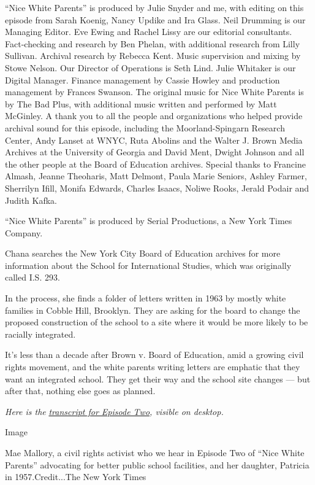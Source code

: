 ``Nice White Parents'' is produced by Julie Snyder and me, with editing
on this episode from Sarah Koenig, Nancy Updike and Ira Glass. Neil
Drumming is our Managing Editor. Eve Ewing and Rachel Lissy are our
editorial consultants. Fact-checking and research by Ben Phelan, with
additional research from Lilly Sullivan. Archival research by Rebecca
Kent. Music supervision and mixing by Stowe Nelson. Our Director of
Operations is Seth Lind. Julie Whitaker is our Digital Manager. Finance
management by Cassie Howley and production management by Frances
Swanson. The original music for Nice White Parents is by The Bad Plus,
with additional music written and performed by Matt McGinley. A thank
you to all the people and organizations who helped provide archival
sound for this episode, including the Moorland-Spingarn Research Center,
Andy Lanset at WNYC, Ruta Abolins and the Walter J. Brown Media Archives
at the University of Georgia and David Ment, Dwight Johnson and all the
other people at the Board of Education archives. Special thanks to
Francine Almash, Jeanne Theoharis, Matt Delmont, Paula Marie Seniors,
Ashley Farmer, Sherrilyn Ifill, Monifa Edwards, Charles Isaacs, Noliwe
Rooks, Jerald Podair and Judith Kafka.

``Nice White Parents'' is produced by Serial Productions, a New York
Times Company.

Chana searches the New York City Board of Education archives for more
information about the School for International Studies, which was
originally called I.S. 293.

In the process, she finds a folder of letters written in 1963 by mostly
white families in Cobble Hill, Brooklyn. They are asking for the board
to change the proposed construction of the school to a site where it
would be more likely to be racially integrated.

It's less than a decade after Brown v. Board of Education, amid a
growing civil rights movement, and the white parents writing letters are
emphatic that they want an integrated school. They get their way and the
school site changes --- but after that, nothing else goes as planned.

\emph{Here is the}
\href{https://www.nytimes3xbfgragh.onion/2020/07/30/podcasts/nice-white-parents-serial-2.html?showTranscript=1}{\emph{transcript
for Episode Two}}\emph{, visible on desktop.}

Image

Mae Mallory, a civil rights activist who we hear in Episode Two of
``Nice White Parents'' advocating for better public school facilities,
and her daughter, Patricia in 1957.Credit...The New York Times

